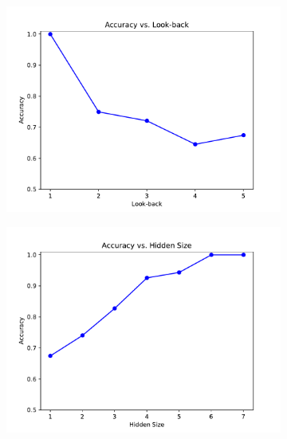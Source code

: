 	\begin{figure}
		\centering
		\begin{subfigure}[b]{0.5\linewidth}
			\centering
			\includegraphics[width=\linewidth]{Images/Python-Plots/accuracy-vs-look-back}
			\caption{
				\label{fig:accuracy-vs-look-back}
			}
		\end{subfigure}%
		\begin{subfigure}[b]{0.5\linewidth}
			\includegraphics[width=\linewidth]{Images/Python-Plots/accuracy-vs-hidden-size}
			\caption{
				\label{fig:accuracy-vs-hidden-size}
			}
		\end{subfigure}
		\caption{}
		\label{}
	\end{figure}
	
	
	
	